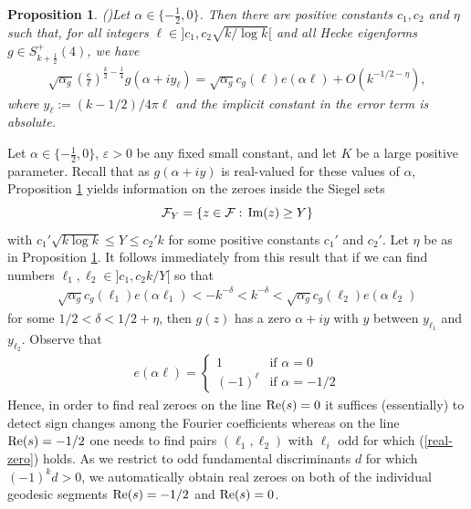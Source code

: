 \documentclass[a4paper,10pt,twoside]{amsart}
\newtheorem{prop}[theorem]{Proposition}
\theoremstyle{definition}
\numberwithin{equation}{section}
\renewcommand{\Re}{\textnormal{Re}}
\renewcommand{\Im}{\textnormal{Im}}
\renewcommand\:{\colon}
\begin{document}
\begin{prop}(\cite[Proposition 6.1.]{Jaasaari2026})\label{Fourier-coeff}
Let $\alpha\in\{-\frac12,0\}$. Then there are positive constants $c_1,c_2$ and $\eta$ such that, for all integers $\ell\in]c_1,c_2\sqrt{k/\log k}[$ and all Hecke eigenforms $g\in S^+_{k+\frac12}(4)$, we have
\begin{align*}
\sqrt{\alpha_g}\left(\frac e{\ell}\right)^{\frac{k}2-\frac14}g(\alpha+iy_\ell)=\sqrt{\alpha_g}c_g(\ell)e(\alpha\ell)+O(k^{-1/2-\eta}),
\end{align*}
where $y_\ell:=(k-1/2)/4\pi\ell$ and the implicit constant in the error term is absolute. 
\end{prop}
 Let $\alpha\in\{-\frac12,0\}$, $\varepsilon>0$ be any fixed small constant, and let $K$ be a large positive parameter. Recall that as $g(\alpha+iy)$ is real-valued for these values of $\alpha$, Proposition \ref{Fourier-coeff} yields information on the zeroes inside the Siegel sets
\[\mathcal F_Y=\{z\in\mathcal F:\, \Im(z)\geq Y\}\]
with $c_1'\sqrt{k\log k}\leq Y\leq c_2'k$ for some positive constants $c_1'$ and $c_2'$. Let $\eta$ be as in Proposition \ref{Fourier-coeff}. It follows immediately from this result that if we can find numbers $\ell_1,\ell_2\in]c_1,c_2k/Y[$ so that 
\begin{align}\label{real-zero}
\sqrt{\alpha_g}c_g(\ell_1)e(\alpha\ell_1)<-k^{-\delta}<k^{-\delta}<\sqrt{\alpha_g}c_g(\ell_2)e(\alpha\ell_2)
\end{align}
for some $1/2<\delta<1/2+\eta$, then $g(z)$ has a zero $\alpha+iy$ with $y$ between $y_{\ell_1}$ and $y_{\ell_2}$. Observe that 
\begin{align*}
e(\alpha\ell)=\begin{cases}
1 & \text{if }\alpha=0\\
(-1)^\ell & \text{if }\alpha=-1/2
\end{cases}
\end{align*}
Hence, in order to find real zeroes on the line $\Re(s)=0$ it suffices (essentially) to detect sign changes among the Fourier coefficients whereas on the line $\Re(s)=-1/2$ one needs to find pairs $(\ell_1,\ell_2)$ with $\ell_i$ odd for which (\ref{real-zero}) holds. As we restrict to odd fundamental discriminants $d$ for which $(-1)^k d>0$, we automatically obtain real zeroes on both of the individual geodesic segments $\Re(s)=-1/2$ and $\Re(s)=0$. 
\end{document}
